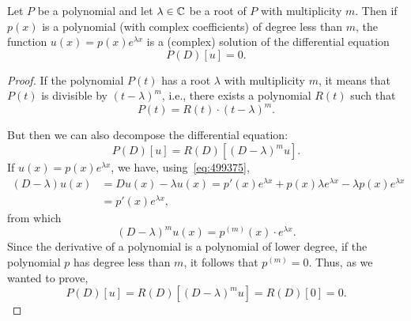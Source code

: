 \begin{theorem}
\mymark{***}
Let $P$ be a polynomial and let $\lambda\in {\mathbb C}$ be a root of $P$ with
multiplicity $m$.
Then if $p(x)$ is a polynomial (with complex coefficients) of degree less than
$m$,
the function $u(x) = p(x) e^{\lambda x}$ is a (complex) solution of the
differential equation
\[
   P(D) [u] = 0.
\]
\end{theorem}
%
\begin{proof}
\mymark{***}
If the polynomial $P(t)$ has a root $\lambda$ with multiplicity $m$, it means
that $P(t)$ is divisible by $(t-\lambda)^m$, i.e., there exists a polynomial
$R(t)$ such that
\[
  P(t) = R(t)\cdot (t-\lambda)^m.
\]

But then we can also decompose the differential equation:
\[
 P(D) [u] = R(D)[(D - \lambda)^m u].
\]
If $u(x) = p(x) e^{\lambda x}$, we have,
using~\eqref{eq:499375},
\begin{align*}
  (D-\lambda) u(x) &= Du(x) -\lambda u(x) =
    p'(x) e^{\lambda x} + p(x) \lambda e^{\lambda x} - \lambda p(x) e^{\lambda
  x} \\
  &= p'(x) e^{\lambda x},
\end{align*}
from which
\[
  (D-\lambda)^m u(x) = p^{(m)}(x) \cdot e^{\lambda x}.
\]
Since the derivative of a polynomial is a polynomial of lower degree,
if the polynomial $p$ has degree less than $m$, it follows that $p^{(m)}=0$.
Thus, as we wanted to prove,
\[
 P(D) [u] = R(D) [(D-\lambda)^m u] = R(D) [0] = 0.
\]
\end{proof}

